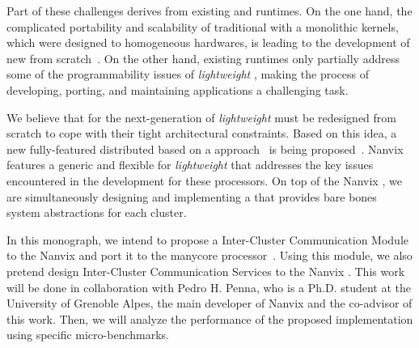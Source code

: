 	Part of these challenges derives from existing \oses and runtimes.
	On the one hand, the complicated portability and scalability of traditional \oses with a
	monolithic kernels, which were designed to homogeneous hardwares, is leading to the development
	of new \oses from scratch~\cite{Baumann2009, kluge2014, nightingale2009, rhoden2011}.
	On the other hand, existing runtimes only partially address some of the programmability issues
	of \textit{lightweight} \manycores, making the process of developing, porting, and maintaining
	applications a challenging task.




	We believe that \oses for the next-generation of \textit{lightweight} \manycores must be
	redesigned from scratch to cope with their tight architectural constraints.
	Based on this idea, a new fully-featured distributed \os based on a \multikernel approach~\cite{Baumann2009}
	is being proposed~\cite{penna2017-1,penna2017-2,penna2019}.
	Nanvix features a generic and flexible \hal for \textit{lightweight} \manycores that
	addresses the key issues encountered in the development for these processors.
	On top of the Nanvix \hal, we are simultaneously designing and implementing a \microkernel
	that provides bare bones system abstractions for each cluster.

	In this monograph, we intend to propose a Inter-Cluster Communication Module to the Nanvix \hal
	and port it to the \mppa manycore processor~\cite{DeDinechin2013-1}.
	Using this module, we also pretend design Inter-Cluster Communication Services to the Nanvix \microkernel.
	This work will be done in collaboration with Pedro H. Penna, who is a Ph.D. student at the
	University of Grenoble Alpes, the main developer of Nanvix and the co-advisor of this work.
	Then, we will analyze the performance of the proposed implementation using specific micro-benchmarks.


